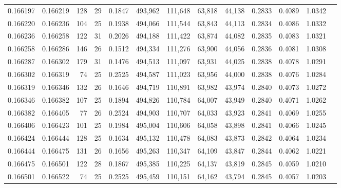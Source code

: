\begin{tabular}{rrrrrrrrrrrrr}
0.166197 & 0.166219 & 128 &  29 &                                     0.1847 & 493,962 & 111,648 &  63,818 &  44,138 & 0.2833 & 0.4089 & 1.0342 \\
0.166220 & 0.166236 & 104 &  25 &                                     0.1938 & 494,066 & 111,544 &  63,843 &  44,113 & 0.2834 & 0.4086 & 1.0332 \\
0.166236 & 0.166258 & 122 &  31 &                                     0.2026 & 494,188 & 111,422 &  63,874 &  44,082 & 0.2835 & 0.4083 & 1.0321 \\
0.166258 & 0.166286 & 146 &  26 &                                     0.1512 & 494,334 & 111,276 &  63,900 &  44,056 & 0.2836 & 0.4081 & 1.0308 \\
0.166287 & 0.166302 & 179 &  31 &                                     0.1476 & 494,513 & 111,097 &  63,931 &  44,025 & 0.2838 & 0.4078 & 1.0291 \\
0.166302 & 0.166319 &  74 &  25 &                                     0.2525 & 494,587 & 111,023 &  63,956 &  44,000 & 0.2838 & 0.4076 & 1.0284 \\
0.166319 & 0.166346 & 132 &  26 &                                     0.1646 & 494,719 & 110,891 &  63,982 &  43,974 & 0.2840 & 0.4073 & 1.0272 \\
0.166346 & 0.166382 & 107 &  25 &                                     0.1894 & 494,826 & 110,784 &  64,007 &  43,949 & 0.2840 & 0.4071 & 1.0262 \\
0.166382 & 0.166405 &  77 &  26 &                                     0.2524 & 494,903 & 110,707 &  64,033 &  43,923 & 0.2841 & 0.4069 & 1.0255 \\
0.166406 & 0.166423 & 101 &  25 &                                     0.1984 & 495,004 & 110,606 &  64,058 &  43,898 & 0.2841 & 0.4066 & 1.0245 \\
0.166424 & 0.166444 & 128 &  25 &                                     0.1634 & 495,132 & 110,478 &  64,083 &  43,873 & 0.2842 & 0.4064 & 1.0234 \\
0.166444 & 0.166475 & 131 &  26 &                                     0.1656 & 495,263 & 110,347 &  64,109 &  43,847 & 0.2844 & 0.4062 & 1.0221 \\
0.166475 & 0.166501 & 122 &  28 &                                     0.1867 & 495,385 & 110,225 &  64,137 &  43,819 & 0.2845 & 0.4059 & 1.0210 \\
0.166501 & 0.166522 &  74 &  25 &                                     0.2525 & 495,459 & 110,151 &  64,162 &  43,794 & 0.2845 & 0.4057 & 1.0203 \\

\end{tabular}
